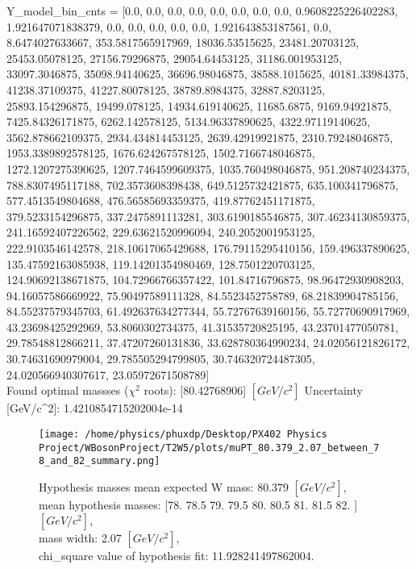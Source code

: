 \documentclass[12pt]{article}
\begin{document}
	Y\_model\_bin\_cnts = [0.0, 0.0, 0.0, 0.0, 0.0, 0.0, 0.0, 0.0, 0.9608225226402283, 1.921647071838379, 0.0, 0.0, 0.0, 0.0, 0.0, 1.921643853187561, 0.0, 8.6474027633667, 353.5817565917969, 18036.53515625, 23481.20703125, 25453.05078125, 27156.79296875, 29054.64453125, 31186.001953125, 33097.3046875, 35098.94140625, 36696.98046875, 38588.1015625, 40181.33984375, 41238.37109375, 41227.80078125, 38789.8984375, 32887.8203125, 25893.154296875, 19499.078125, 14934.619140625, 11685.6875, 9169.94921875, 7425.84326171875, 6262.142578125, 5134.96337890625, 4322.97119140625, 3562.878662109375, 2934.434814453125, 2639.42919921875, 2310.79248046875, 1953.3389892578125, 1676.624267578125, 1502.7166748046875, 1272.1207275390625, 1207.7464599609375, 1035.760498046875, 951.208740234375, 788.8307495117188, 702.3573608398438, 649.5125732421875, 635.100341796875, 577.4513549804688, 476.56585693359375, 419.87762451171875, 379.5233154296875, 337.2475891113281, 303.6190185546875, 307.46234130859375, 241.16592407226562, 229.63621520996094, 240.2052001953125, 222.9103546142578, 218.10617065429688, 176.79115295410156, 159.496337890625, 135.47592163085938, 119.14201354980469, 128.7501220703125, 124.90692138671875, 104.72966766357422, 101.84716796875, 98.96472930908203, 94.16057586669922, 75.90497589111328, 84.5523452758789, 68.21839904785156, 84.55237579345703, 61.492637634277344, 55.72767639160156, 55.72770690917969, 43.23698425292969, 53.8060302734375, 41.31535720825195, 43.23701477050781, 29.78548812866211, 37.47207260131836, 33.628780364990234, 24.02056121826172, 30.74631690979004, 29.785505294799805, 30.746320724487305, 24.020566940307617, 23.05972671508789]\\

    Found optimal massses ($\chi^2$ roots): [80.42768906] $[GeV/c^{2}]$
    Uncertainty [GeV/c^2]: 1.4210854715202004e-14

	\begin{figure}[tb]
		\centering
		\texttt{[image: /home/physics/phuxdp/Desktop/PX402 Physics Project/WBosonProject/T2W5/plots/muPT\_80.379\_2.07\_between\_78\_and\_82\_summary.png]}
		\caption{\small Hypothesis masses mean expected W mass: 80.379 $[GeV/c^{2}]$,\\
mean hypothesis masses: [78.  78.5 79.  79.5 80.  80.5 81.  81.5 82. ] $[GeV/c^{2}]$,\\
mass width: 2.07 $[GeV/c^{2}]$,\\
chi_square value of hypothesis fit: 11.928241497862004. }
		\label{fig: fig_0}
	\end{figure}
\end{document}
